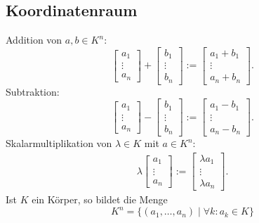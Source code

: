 \subsection{Koordinatenraum}
Addition von $a,b\in K^n$:
\begin{equation}\label{eq:Koordinatenraum-Addition}
\begin{bmatrix}
a_1\\
\vdots\\
a_n
\end{bmatrix}
+\begin{bmatrix}
b_1\\
\vdots\\
b_n
\end{bmatrix}
:= \begin{bmatrix}
a_1+b_1\\
\vdots\\
a_n+b_n
\end{bmatrix}.
\end{equation}
Subtraktion:
\begin{equation}
\begin{bmatrix}
a_1\\
\vdots\\
a_n
\end{bmatrix}
-\begin{bmatrix}
b_1\\
\vdots\\
b_n
\end{bmatrix}
:= \begin{bmatrix}
a_1-b_1\\
\vdots\\
a_n-b_n
\end{bmatrix}.
\end{equation}
Skalarmultiplikation von $\lambda\in K$ mit $a\in K^n$:
\begin{align}\label{eq:Koordinatenraum-Skalarmultiplikation}
\lambda\begin{bmatrix}
a_1\\
\vdots\\
a_n
\end{bmatrix}
:= \begin{bmatrix}
\lambda a_1\\
\vdots\\
\lambda a_n
\end{bmatrix}.
\end{align}
Ist $K$ ein Körper, so bildet die Menge
\begin{equation}
K^n = \{(a_1,\ldots,a_n)\mid \forall k\colon a_k\in K\}
\end{equation}
